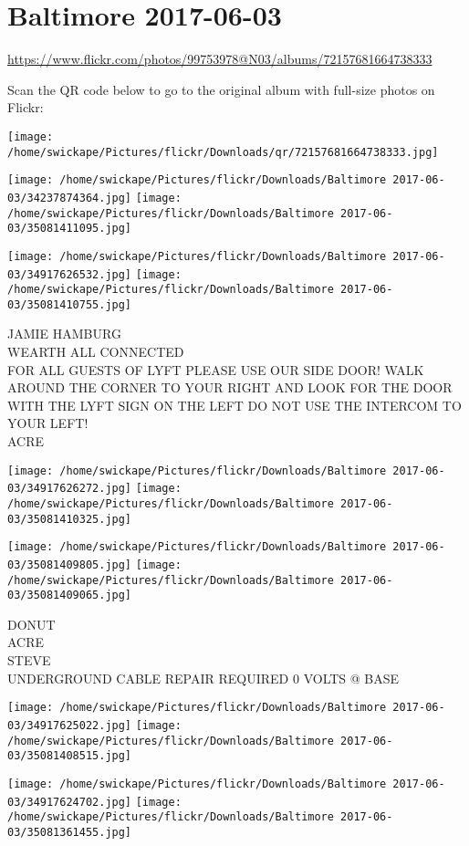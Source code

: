 \documentclass[10pt,letterpaper]{article}
\title{}
\author{}
\date{}
\begin{document}
\section*{Baltimore 2017-06-03}

\url{https://www.flickr.com/photos/99753978@N03/albums/72157681664738333}

Scan the QR code below to go to the original album with full-size photos on Flickr:

\texttt{[image: /home/swickape/Pictures/flickr/Downloads/qr/72157681664738333.jpg]}
\pagebreak

\texttt{[image: /home/swickape/Pictures/flickr/Downloads/Baltimore 2017-06-03/34237874364.jpg]}
\texttt{[image: /home/swickape/Pictures/flickr/Downloads/Baltimore 2017-06-03/35081411095.jpg]}

\texttt{[image: /home/swickape/Pictures/flickr/Downloads/Baltimore 2017-06-03/34917626532.jpg]}
\texttt{[image: /home/swickape/Pictures/flickr/Downloads/Baltimore 2017-06-03/35081410755.jpg]}

JAMIE HAMBURG\\
WEARTH ALL CONNECTED\\
FOR ALL GUESTS OF LYFT PLEASE USE OUR SIDE DOOR!  WALK AROUND THE CORNER TO YOUR RIGHT AND LOOK FOR THE DOOR WITH THE LYFT SIGN ON THE LEFT DO NOT USE THE INTERCOM TO YOUR LEFT!\\
ACRE
\pagebreak

\texttt{[image: /home/swickape/Pictures/flickr/Downloads/Baltimore 2017-06-03/34917626272.jpg]}
\texttt{[image: /home/swickape/Pictures/flickr/Downloads/Baltimore 2017-06-03/35081410325.jpg]}

\texttt{[image: /home/swickape/Pictures/flickr/Downloads/Baltimore 2017-06-03/35081409805.jpg]}
\texttt{[image: /home/swickape/Pictures/flickr/Downloads/Baltimore 2017-06-03/35081409065.jpg]}

DONUT\\
ACRE\\
STEVE\\
UNDERGROUND CABLE REPAIR REQUIRED 0 VOLTS @ BASE
\pagebreak

\texttt{[image: /home/swickape/Pictures/flickr/Downloads/Baltimore 2017-06-03/34917625022.jpg]}
\texttt{[image: /home/swickape/Pictures/flickr/Downloads/Baltimore 2017-06-03/35081408515.jpg]}

\texttt{[image: /home/swickape/Pictures/flickr/Downloads/Baltimore 2017-06-03/34917624702.jpg]}
\texttt{[image: /home/swickape/Pictures/flickr/Downloads/Baltimore 2017-06-03/35081361455.jpg]}
\end{document}
